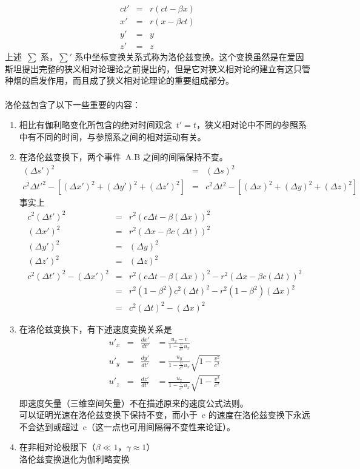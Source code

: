 $$
\begin{array}{lcl}
ct'&=&r(ct-\beta x)\\
x'&=&r(x-\beta ct)\\
y'&=&y\\
z'&=&z
\end{array}
$$
上述~$\sum$ 系，$\sum'$ 系中坐标变换关系式称为洛伦兹变换。这个变换虽然是在爱因斯坦提出完整的狭义相对论理论之前提出的，但是它对狭义相对论的建立有这只管种烟的启发作用，而且成了狭义相对论理论的重要组成部分。\\
\\
洛伦兹包含了以下一些重要的内容：\\
\begin{enumerate}
\item 相比有伽利略变化所包含的绝对时间观念~$t'=t$，狭义相对论中不同的参照系中有不同的时间，与参照系之间的相对运动有关。
\item 在洛伦兹变换下，两个事件~A.B 之间的间隔保持不变。\\
$$
\begin{array}{rcl}
(\Delta s')^{2}&=&(\Delta s)^{2}\\
c^{2}\Delta t'^{2}-[(\Delta x')^{2}+(\Delta y')^{2}+(\Delta z')^{2}]&=&c^{2}\Delta t^{2}-[(\Delta x)^{2}+(\Delta y)^{2}+(\Delta z)^{2}]
\end{array}
$$
事实上
$$
\begin{array}{rcl}
c^{2}(\Delta t')^{2}&=&r^{2}(c\Delta t-\beta (\Delta x))^{2}\\
(\Delta x')^{2}&=&r^{2}(\Delta x-\beta c(\Delta t))^{2}\\
(\Delta y')^{2}&=&(\Delta y)^{2}\\
(\Delta z')^{2}&=&(\Delta z)^{2}\\
c^{2}(\Delta t')^{2}-(\Delta x')^{2}&=&r^{2}(c\Delta t-\beta (\Delta x))^{2}-r^{2}(\Delta x-\beta c(\Delta t))^{2}\\
&=&r^{2}(1-\beta^{2})c^{2}(\Delta t)^{2}-r^{2}(1-\beta^{2})(\Delta x)^{2}\\
&=&c^{2}(\Delta t)^{2}-(\Delta x)^{2}
\end{array}
$$
\item 在洛伦兹变换下，有下述速度变换关系是
$$
\begin{array}{rcccl}
u'_{x}&=&\frac{dx'}{dt'}&=\frac{u_{x}-v}{1-\frac{v}{c^{2}}u_{x}}\\
u'_{y}&=&\frac{dy'}{dt'}&=\frac{u_{y}}{1-\frac{v}{c^{2}}u_{x}}\sqrt{1-\frac{v^{2}}{c^{2}}}\\
u'_{z}&=&\frac{dz'}{dt'}&=\frac{u_{z}}{1-\frac{v}{c^{2}}u_{x}}\sqrt{1-\frac{v^{2}}{c^{2}}}\\
\end{array}
$$
即速度矢量（三维空间矢量）不在描述原来的速度公式法则。\\
可以证明光速在洛伦兹变换下保持不变，而小于~c 的速度在洛伦兹变换下永远不会达到或超过~c（这一点也可用间隔得不变性来论证）。\\
\item 在非相对论极限下（$\beta\ll 1， \gamma\approx 1$）\\
洛伦兹变换退化为伽利略变换\\
\end{enumerate}

